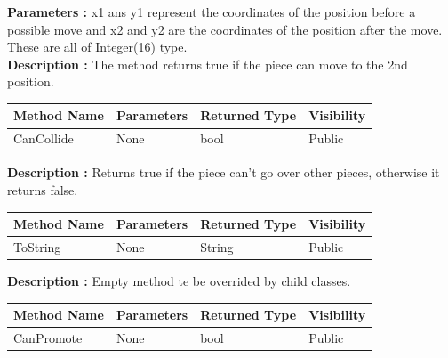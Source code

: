 \documentclass[12pt]{article}
\begin{document}
\textbf{Parameters :} x1 ans y1 represent the coordinates of the position before a possible move
and x2 and y2 are the coordinates of the position after the move. These are all of Integer(16) type.
\\
\textbf{Description :} The method returns true if the piece can move to the 2nd position.

\begin{table}[H]
    \begin{tabular}{|l|l|l|l|}
    \hline
    \rowcolor[HTML]{EFEFEF} 
    \cellcolor[HTML]{EFEFEF}\textbf{Method Name} & \textbf{Parameters}  & \textbf{Returned Type} & \textbf{Visibility} \\ \hline
    CanCollide                                   & None                 & bool                   & Public              \\ \hline
    \end{tabular}
\end{table}

\textbf{Description :} Returns true if the piece can't go over other pieces, otherwise
it returns false.

\begin{table}[H]
    \begin{tabular}{|l|l|l|l|}
    \hline
    \rowcolor[HTML]{EFEFEF} 
    \cellcolor[HTML]{EFEFEF}\textbf{Method Name} & \textbf{Parameters}  & \textbf{Returned Type} & \textbf{Visibility} \\ \hline
    ToString                                   & None                 & String                   & Public              \\ \hline
    \end{tabular}
\end{table}

\textbf{Description :} Empty method te be overrided by child classes.

\begin{table}[H]
    \begin{tabular}{|l|l|l|l|}
    \hline
    \rowcolor[HTML]{EFEFEF} 
    \cellcolor[HTML]{EFEFEF}\textbf{Method Name} & \textbf{Parameters}  & \textbf{Returned Type} & \textbf{Visibility} \\ \hline
    CanPromote                                   & None                 & bool                   & Public              \\ \hline
    \end{tabular}
\end{table}
\end{document}
